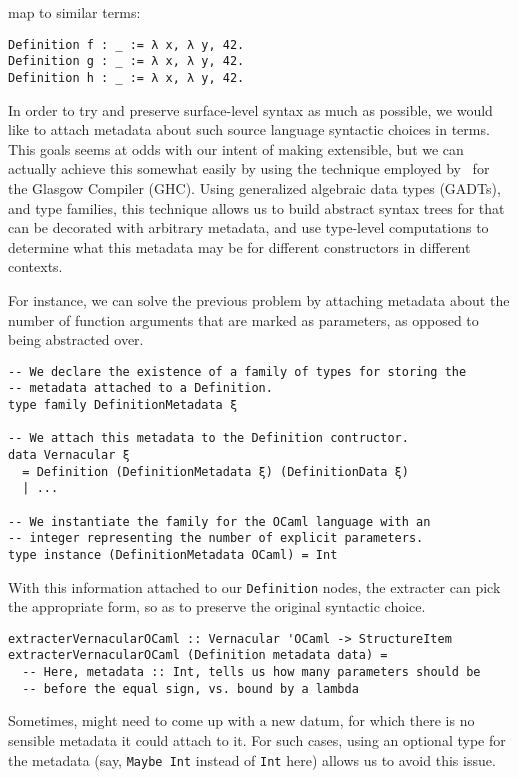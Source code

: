 map to similar \Chick{} terms:

\begin{verbatim}
Definition f : _ := λ x, λ y, 42.
Definition g : _ := λ x, λ y, 42.
Definition h : _ := λ x, λ y, 42.
\end{verbatim}

In order to try and preserve surface-level syntax as much as possible, we would
like to attach metadata about such source language syntactic choices in \Chick{}
terms.  This goals seems at odds with our intent of making \Coop{} extensible,
but we can actually achieve this somewhat easily by using the technique employed
by~ for the Glasgow \Haskell{} Compiler (GHC).  Using
generalized algebraic data types (GADTs), and type families, this technique
allows us to build abstract syntax trees for \Chick{} that can be decorated with
arbitrary metadata, and use type-level computations to determine what this
metadata may be for different constructors in different contexts.

For instance, we can solve the previous problem by attaching metadata about the
number of function arguments that are marked as parameters, as opposed to being
abstracted over.

\begin{verbatim}
-- We declare the existence of a family of types for storing the
-- metadata attached to a Definition.
type family DefinitionMetadata ξ

-- We attach this metadata to the Definition contructor.
data Vernacular ξ
  = Definition (DefinitionMetadata ξ) (DefinitionData ξ)
  | ...

-- We instantiate the family for the OCaml language with an
-- integer representing the number of explicit parameters.
type instance (DefinitionMetadata OCaml) = Int
\end{verbatim}

With this information attached to our \texttt{Definition} nodes,
the extracter can pick the appropriate form, so as to preserve the original
syntactic choice.

\begin{verbatim}
extracterVernacularOCaml :: Vernacular 'OCaml -> StructureItem
extracterVernacularOCaml (Definition metadata data) =
  -- Here, metadata :: Int, tells us how many parameters should be
  -- before the equal sign, vs. bound by a lambda
\end{verbatim}

Sometimes, \Chick{} might need to come up with a new datum, for which there is
no sensible metadata it could attach to it.  For such cases, using an optional
type for the metadata (say, \texttt{Maybe Int} instead of
\texttt{Int} here) allows us to avoid this issue.

